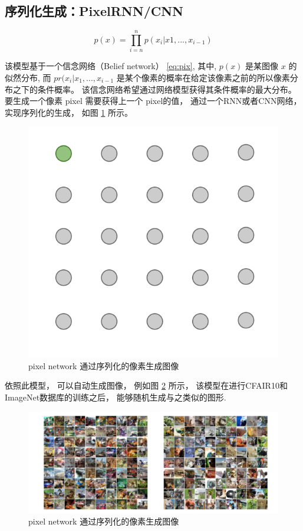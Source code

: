 \subsection{序列化生成：PixelRNN/CNN}

\begin{equation}\label{eq:pix}
p(x) = \prod_{i=n}^{n} p(x_i|x1, ..., x_{i-1})
\end{equation}

该模型基于一个信念网络（Belief network） \eqref{eq:pix}, 其中, $ p(x) $ 是某图像 $x$ 的似然分布, 而 $pr(x_i|x_1, ..., x_{i-1}$ 是某个像素的概率在给定该像素之前的所以像素分布之下的条件概率。 该信念网络希望通过网络模型获得其条件概率的最大分布。 要生成一个像素 pixel 需要获得上一个 pixel的值， 通过一个RNN或者CNN网络， 实现序列化的生成， 如图 \ref{img:pix-matrix} 所示。 

\begin{figure}[htbp]
    \centering 
    \includegraphics[width = .55\linewidth]{data/chapter-2/pixel_matrix.png} 
    \caption{pixel network 通过序列化的像素生成图像} 
    \label{img:pix-matrix} 
\end{figure}

依照此模型， 可以自动生成图像， 例如图 \ref{img:pix-example} 所示， 该模型在进行CFAIR10和ImageNet数据库的训练之后， 能够随机生成与之类似的图形. 

\begin{figure}[htbp]
    \centering  %
    \includegraphics[width = .55\linewidth]{data/chapter-2/pixel_example.png} %
    \caption{pixel network 通过序列化的像素生成图像} %
    \label{img:pix-example} %
\end{figure}




